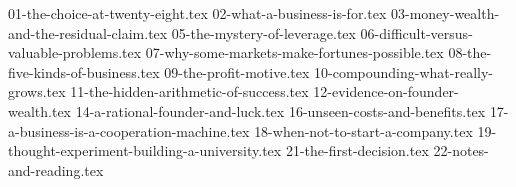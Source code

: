
\addtolength{\parskip}{2pt}

{01-the-choice-at-twenty-eight.tex}
{02-what-a-business-is-for.tex}
{03-money-wealth-and-the-residual-claim.tex}
{05-the-mystery-of-leverage.tex}
{06-difficult-versus-valuable-problems.tex}
{07-why-some-markets-make-fortunes-possible.tex}
{08-the-five-kinds-of-business.tex}
{09-the-profit-motive.tex}
{10-compounding-what-really-grows.tex}
{11-the-hidden-arithmetic-of-success.tex}
{12-evidence-on-founder-wealth.tex}
{14-a-rational-founder-and-luck.tex}
{16-unseen-costs-and-benefits.tex}
{17-a-business-is-a-cooperation-machine.tex}
{18-when-not-to-start-a-company.tex}
{19-thought-experiment-building-a-university.tex}
{21-the-first-decision.tex}
{22-notes-and-reading.tex}
